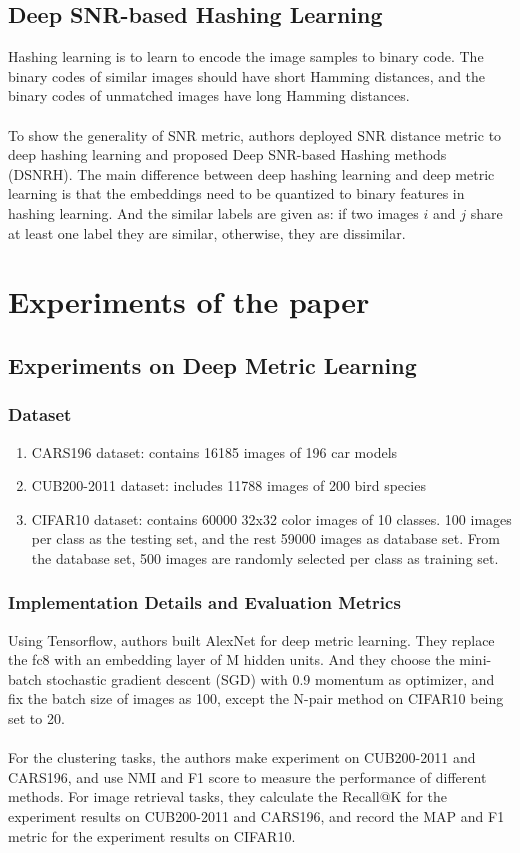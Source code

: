 \documentclass[12pt,paper=a4]{scrartcl}
\theoremstyle{break}
\begin{document}
\subsection{Deep SNR-based Hashing Learning}
Hashing learning is to learn to encode the image samples to binary code. The binary codes of similar images should have short Hamming distances, and the binary codes of unmatched images have long Hamming distances. \\ \\
To show the generality of SNR metric, authors deployed SNR distance metric to deep hashing learning and proposed Deep SNR-based Hashing methods (DSNRH). The main difference between deep hashing learning and deep metric learning is that the embeddings need to be quantized to binary features in hashing learning. And the similar labels are given as: if two images $i$ and $j$ share at least one label they are similar, otherwise, they are dissimilar.\cite{source1}
\section{Experiments of the paper}
\subsection{Experiments on Deep Metric Learning}
\subsubsection{Dataset}
\begin{enumerate}
\item CARS196 dataset: contains 16185 images of 196 car models
\item CUB200-2011 dataset: includes 11788 images of 200 bird species
\item CIFAR10 dataset: contains 60000 32x32 color images of 10 classes. 100 images per class as the testing set, and the rest 59000 images as database set. From the database set, 500 images are randomly selected per class as training set.
\end{enumerate}
\subsubsection{Implementation Details and Evaluation Metrics}
Using Tensorflow, authors built AlexNet for deep metric learning. They replace the fc8 with an embedding layer of M hidden units. And they choose the mini-batch stochastic gradient descent (SGD) with 0.9 momentum as optimizer, and fix the batch size of images as 100, except the N-pair method on CIFAR10 being set to 20. \\ \\
For the clustering tasks, the authors make experiment on CUB200-2011 and CARS196, and use NMI and F1 score to measure the performance of different methods. For image retrieval tasks, they calculate the Recall@K for the experiment results on CUB200-2011 and CARS196, and record the MAP and F1 metric for the experiment results on CIFAR10.
\end{document}
